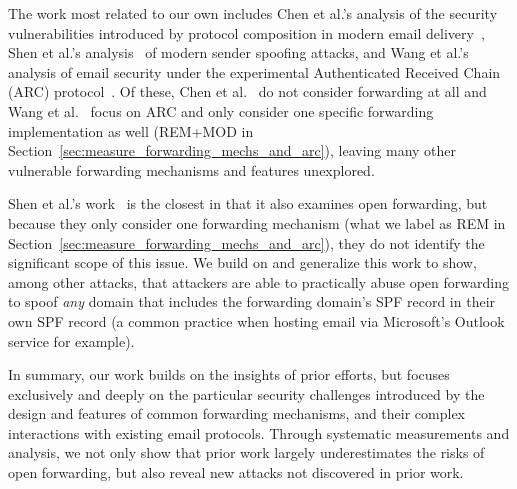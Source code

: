 The work most related to our own includes Chen et al.'s analysis of
the security vulnerabilities introduced by protocol composition in
modern email delivery~\cite{chen2020composition}, Shen et al.'s
analysis~\cite{shen2020weak} of modern sender spoofing attacks, and Wang et al.'s~\cite{wang2022revisiting} analysis of email security under the experimental Authenticated Received Chain (ARC) protocol~\cite{rfc8617}.
Of these, Chen et al.~\cite{chen2020composition} do not consider forwarding at all and Wang et al.~\cite{wang2022revisiting} focus on ARC and only consider one specific forwarding implementation as well (REM+MOD in Section~\ref{sec:measure_forwarding_mechs_and_arc}), leaving many other vulnerable forwarding mechanisms and features unexplored.

Shen et al.'s work~\cite{shen2020weak} is the closest in that it also
examines open forwarding, but because they only consider one
forwarding mechanism (what we label as REM in
Section~\ref{sec:measure_forwarding_mechs_and_arc}), they do not
identify the significant scope of this issue.  We build on and
generalize this work to show, among other attacks, that attackers are
able to practically abuse open forwarding to spoof \emph{any} domain
that includes the forwarding domain's SPF record in their own SPF record (a
common practice when hosting email via Microsoft's Outlook service for example).



In summary, our work builds on the insights of prior efforts, but focuses exclusively and deeply on the particular security challenges introduced by the design and features of common forwarding mechanisms, and their complex interactions with existing email protocols. Through systematic measurements and analysis, we not only show that prior work largely underestimates the risks of open forwarding,
but also reveal new attacks not discovered in prior work.



